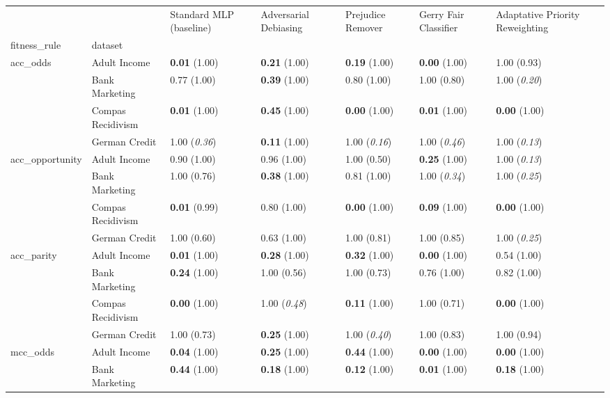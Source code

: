\begin{tabular}{lllllll}
\toprule
 &  & Standard MLP (baseline) & Adversarial Debiasing & Prejudice Remover & Gerry Fair Classifier & Adaptative Priority Reweighting \\
fitness_rule & dataset &  &  &  &  &  \\
\midrule
\multirow[t]{4}{*}{acc_odds} & Adult Income & \textbf{0.01} (1.00) & \textbf{0.21} (1.00) & \textbf{0.19} (1.00) & \textbf{0.00} (1.00) & 1.00 (0.93) \\
 & Bank Marketing & 0.77 (1.00) & \textbf{0.39} (1.00) & 0.80 (1.00) & 1.00 (0.80) & 1.00 (\textit{0.20}) \\
 & Compas Recidivism & \textbf{0.01} (1.00) & \textbf{0.45} (1.00) & \textbf{0.00} (1.00) & \textbf{0.01} (1.00) & \textbf{0.00} (1.00) \\
 & German Credit & 1.00 (\textit{0.36}) & \textbf{0.11} (1.00) & 1.00 (\textit{0.16}) & 1.00 (\textit{0.46}) & 1.00 (\textit{0.13}) \\
\cline{1-7}
\multirow[t]{4}{*}{acc_opportunity} & Adult Income & 0.90 (1.00) & 0.96 (1.00) & 1.00 (0.50) & \textbf{0.25} (1.00) & 1.00 (\textit{0.13}) \\
 & Bank Marketing & 1.00 (0.76) & \textbf{0.38} (1.00) & 0.81 (1.00) & 1.00 (\textit{0.34}) & 1.00 (\textit{0.25}) \\
 & Compas Recidivism & \textbf{0.01} (0.99) & 0.80 (1.00) & \textbf{0.00} (1.00) & \textbf{0.09} (1.00) & \textbf{0.00} (1.00) \\
 & German Credit & 1.00 (0.60) & 0.63 (1.00) & 1.00 (0.81) & 1.00 (0.85) & 1.00 (\textit{0.25}) \\
\cline{1-7}
\multirow[t]{4}{*}{acc_parity} & Adult Income & \textbf{0.01} (1.00) & \textbf{0.28} (1.00) & \textbf{0.32} (1.00) & \textbf{0.00} (1.00) & 0.54 (1.00) \\
 & Bank Marketing & \textbf{0.24} (1.00) & 1.00 (0.56) & 1.00 (0.73) & 0.76 (1.00) & 0.82 (1.00) \\
 & Compas Recidivism & \textbf{0.00} (1.00) & 1.00 (\textit{0.48}) & \textbf{0.11} (1.00) & 1.00 (0.71) & \textbf{0.00} (1.00) \\
 & German Credit & 1.00 (0.73) & \textbf{0.25} (1.00) & 1.00 (\textit{0.40}) & 1.00 (0.83) & 1.00 (0.94) \\
\cline{1-7}
\multirow[t]{4}{*}{mcc_odds} & Adult Income & \textbf{0.04} (1.00) & \textbf{0.25} (1.00) & \textbf{0.44} (1.00) & \textbf{0.00} (1.00) & \textbf{0.00} (1.00) \\
 & Bank Marketing & \textbf{0.44} (1.00) & \textbf{0.18} (1.00) & \textbf{0.12} (1.00) & \textbf{0.01} (1.00) & \textbf{0.18} (1.00) \\

\end{tabular}
